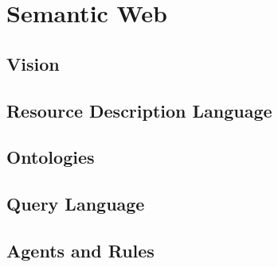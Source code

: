 
\section{Semantic Web}
\label{sec:semantic_web}

\subsection{Vision}
\label{sec:semantic_vision}


\subsection{Resource Description Language}
\label{sec:semantic_rdl}


\subsection{Ontologies}
\label{sec:semantic_ontologies}



\subsection{Query Language}
\label{sec:semantic_querylang}



\subsection{Agents and Rules}
\label{sec:semantic_logic_rules}




